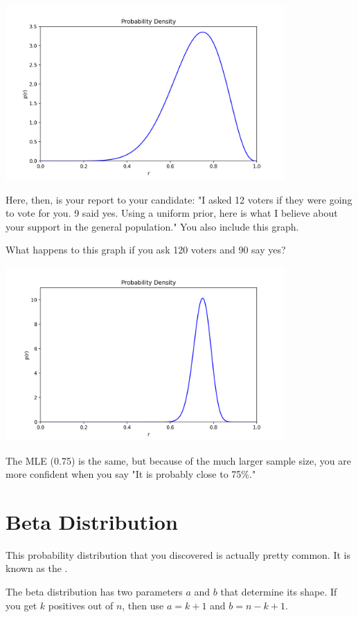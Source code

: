 \includegraphics[width=0.8\textwidth]{bayes.png}

Here, then, is your report to your candidate: "I asked 12 voters if they were going to vote for you.  9 said yes.  Using a uniform prior,  here is what I believe about your support in the general 
population."  You also include this graph.

What happens to this graph if you ask 120 voters and 90 say yes?

\includegraphics[width=0.8\textwidth]{bayes_tight.png}

The MLE (0.75) is the same,  but because of the much larger sample size,   you are more confident when you say "It is probably close to 75\%."

\section{Beta Distribution}

This probability distribution that you discovered is actually pretty common.  It is known as the .   

The beta distribution has two parameters $a$ and $b$ that determine its shape.  If you get $k$ positives out of $n$,  then use $a = k +1$ and $b = n - k + 1$.

